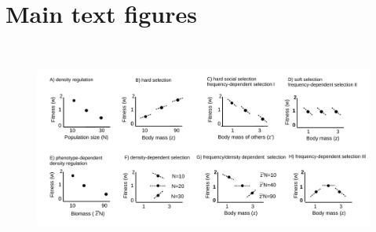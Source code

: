 \documentclass{article}
\begin{document}
\newpage
\section{Main text figures}

\begin{figure} [H]
	\centering
	\includegraphics[width=15cm, height=7cm]{Figures/Fig2.pdf}

\end{figure}
\end{document}
